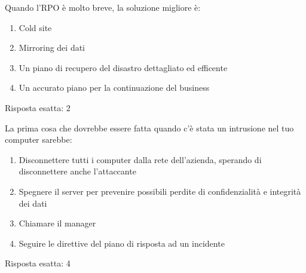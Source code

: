 
\begin{Exercise} [
  title={RTO Stretto},
  label={bcdr3}
 ]
 
 \Question Quando l'RPO è molto breve, la soluzione migliore è:
 \begin{enumerate}
  \item Cold site
  \item Mirroring dei dati
  \item Un piano di recupero del disastro dettagliato ed efficente
  \item Un accurato piano per la continuazione del business
 \end{enumerate}

\end{Exercise}

\begin{Answer} [
  ref={bcdr3},
  number={3}
 ]

 \Question Risposta esatta: 2
\end{Answer}

\label{EsBCDR2}

\begin{Exercise} [
  title={Azioni da intraprendere},
  label={bcdr4}
 ]
 
 \Question La prima cosa che dovrebbe essere fatta quando c'è stata un 
 intrusione nel tuo computer sarebbe:
 \begin{enumerate}
   \item Disconnettere tutti i computer dalla rete dell'azienda, sperando di 
   disconnettere anche l'attaccante
   \item Spegnere il server per prevenire possibili perdite di confidenzialità 
   e integrità dei dati
   \item Chiamare il manager
   \item Seguire le direttive del piano di risposta ad un incidente
 \end{enumerate}
  
\end{Exercise}

\begin{Answer} [
  ref={bcdr4},
  number={4}
 ]
 
 \Question Risposta esatta: 4
\end{Answer}



